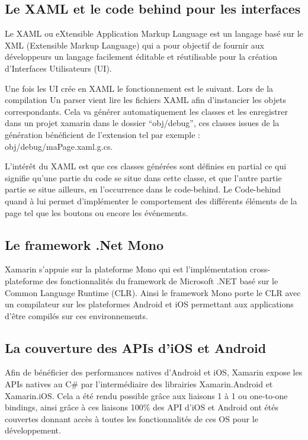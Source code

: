 \documentclass[11]{article}
\begin{document}
\subsection{Le XAML et le code behind pour les interfaces}
Le XAML ou eXtensible Application Markup Language est un langage basé sur le XML (Extensible Markup Language) qui a pour objectif de fournir aux développeurs un langage facilement éditable et réutilisable pour la création d’Interfaces Utilisateurs (UI).
      
 \vspace{0.5cm}
 
Une fois les UI crée en XAML le fonctionnement est le suivant. Lors de la compilation Un parser vient lire les fichiers XAML afin d’instancier les objets correspondants. Cela va générer automatiquement les classes et les enregistrer dans un projet xamarin dans le dossier “obj/debug”, ces classes issues de la génération bénéficient de l’extension tel par exemple : obj/debug/maPage.xaml.g.cs.
      
 \vspace{0.5cm}
 
L’intérêt du XAML est que ces classes générées sont définies en partial ce qui signifie qu’une partie du code se situe dans cette classe, et que l’autre partie partie se situe ailleurs, en l'occurrence dans le code-behind. Le Code-behind quand à lui permet d’implémenter le comportement des différents éléments de la page tel que les boutons ou encore les événements.


\subsection{Le framework .Net Mono}
Xamarin s’appuie sur la plateforme Mono qui est l’implémentation cross-plateforme des fonctionnalités du framework de Microsoft .NET basé sur le Common Language Runtime (CLR). 
Ainsi le framework Mono porte le CLR avec un compilateur sur les plateformes Android et iOS permettant aux applications d’être compilés sur ces environnements.

\subsection{La couverture des APIs d’iOS et Android}
Afin de bénéficier des performances natives d’Android et iOS, Xamarin expose les APIs natives au C\# par l’intermédiaire des librairies Xamarin.Android et Xamarin.iOS.
Cela a été rendu possible grâce aux liaisons 1 à 1 ou one-to-one bindings, ainsi grâce à ces liaisons 100\% des API d’iOS et Android ont étés couvertes donnant accès à toutes les fonctionnalités de ces OS pour le développement.
\end{document}

